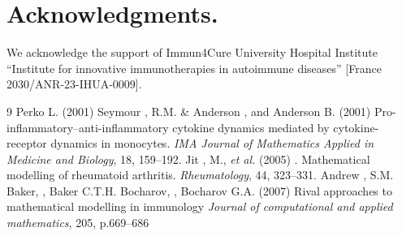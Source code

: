 \documentclass[a4paper, 12pt]{article}
\providecommand{\DIFaddtex}[1]{{\protect\color{blue} \sf #1}} %
\providecommand{\DIFdeltex}[1]{{\protect\color{red} \scriptsize #1}} %
\providecommand{\DIFaddbegin}{} %
\providecommand{\DIFaddend}{} %
\providecommand{\DIFdelbegin}{} %
\providecommand{\DIFdelend}{} %
\providecommand{\DIFadd}[1]{\texorpdfstring{\DIFaddtex{#1}}{#1}} %
\providecommand{\DIFdel}[1]{\texorpdfstring{\DIFdeltex{#1}}{}} %
\begin{document}
\section*{Acknowledgments.}
We acknowledge the support of Immun4Cure University Hospital Institute ``Institute for innovative immunotherapies in autoimmune diseases'' [France 2030/ANR-23-IHUA-0009].
\begin{thebibliography}{9}
\DIFaddbegin {}
\DIFadd{Perko L. (2001)
}
\DIFaddend {}
Seymour \DIFdelbegin \DIFdel{, }\DIFdelend R.M. \DIFdelbegin \DIFdel{\& Anderson , }\DIFdelend \DIFaddbegin \DIFadd{and Anderson }\DIFaddend B. (2001)
\DIFdelbegin %
\DIFdel{Pro-inflammatory–anti-inflammatory cytokine dynamics
mediated by cytokine-receptor dynamics in monocytes.
}%
\DIFdel{\emph{IMA Journal of Mathematics Applied in Medicine and Biology}, 
  18, 159–192.
}%
\DIFdelend \DIFaddbegin {}
\DIFaddend %
Jit \DIFdelbegin \DIFdel{, }\DIFdelend M., \textit{et al.} (2005)\DIFdelbegin \DIFdel{.}\DIFdelend %
\DIFdelbegin %
\DIFdel{Mathematical modelling of rheumatoid arthritis.
}%
\DIFdel{\emph{Rheumatology}, 44, 323--331.
}%
\DIFdelend \DIFaddbegin {}
\DIFaddend %
 Andrew  \DIFdelbegin \DIFdel{, }\DIFdelend S.M.\DIFdelbegin \DIFdel{Baker,
}\DIFdelend \DIFaddbegin \DIFadd{,
Baker }\DIFaddend C.T.H.\DIFdelbegin \DIFdel{Bocharov,
}\DIFdelend \DIFaddbegin \DIFadd{,
Bocharov }\DIFaddend G.A. (2007)
\DIFdelbegin %
\DIFdel{Rival approaches to mathematical modelling in immunology
}%
\DIFdel{\emph{Journal of computational and applied mathematics}, 205, p.669--686
}%
\DIFdelend \DIFaddbegin {}
\DIFaddend 


\end{thebibliography}
\end{document}
